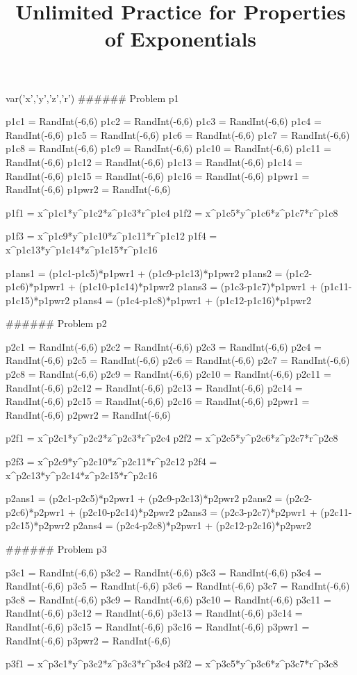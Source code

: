 \documentclass{ximera}
\title{Unlimited Practice for Properties of Exponentials}
\begin{document}


\begin{sagesilent}
var('x','y','z','r')
###### Problem p1

p1c1 = RandInt(-6,6)
p1c2 = RandInt(-6,6)
p1c3 = RandInt(-6,6)
p1c4 = RandInt(-6,6)
p1c5 = RandInt(-6,6)
p1c6 = RandInt(-6,6)
p1c7 = RandInt(-6,6)
p1c8 = RandInt(-6,6)
p1c9 = RandInt(-6,6)
p1c10 = RandInt(-6,6)
p1c11 = RandInt(-6,6)
p1c12 = RandInt(-6,6)
p1c13 = RandInt(-6,6)
p1c14 = RandInt(-6,6)
p1c15 = RandInt(-6,6)
p1c16 = RandInt(-6,6)
p1pwr1 = RandInt(-6,6)
p1pwr2 = RandInt(-6,6)

p1f1 = x^p1c1*y^p1c2*z^p1c3*r^p1c4
p1f2 = x^p1c5*y^p1c6*z^p1c7*r^p1c8

p1f3 = x^p1c9*y^p1c10*z^p1c11*r^p1c12
p1f4 = x^p1c13*y^p1c14*z^p1c15*r^p1c16

p1ans1 = (p1c1-p1c5)*p1pwr1 + (p1c9-p1c13)*p1pwr2
p1ans2 = (p1c2-p1c6)*p1pwr1 + (p1c10-p1c14)*p1pwr2
p1ans3 = (p1c3-p1c7)*p1pwr1 + (p1c11-p1c15)*p1pwr2
p1ans4 = (p1c4-p1c8)*p1pwr1 + (p1c12-p1c16)*p1pwr2


###### Problem p2

p2c1 = RandInt(-6,6)
p2c2 = RandInt(-6,6)
p2c3 = RandInt(-6,6)
p2c4 = RandInt(-6,6)
p2c5 = RandInt(-6,6)
p2c6 = RandInt(-6,6)
p2c7 = RandInt(-6,6)
p2c8 = RandInt(-6,6)
p2c9 = RandInt(-6,6)
p2c10 = RandInt(-6,6)
p2c11 = RandInt(-6,6)
p2c12 = RandInt(-6,6)
p2c13 = RandInt(-6,6)
p2c14 = RandInt(-6,6)
p2c15 = RandInt(-6,6)
p2c16 = RandInt(-6,6)
p2pwr1 = RandInt(-6,6)
p2pwr2 = RandInt(-6,6)

p2f1 = x^p2c1*y^p2c2*z^p2c3*r^p2c4
p2f2 = x^p2c5*y^p2c6*z^p2c7*r^p2c8

p2f3 = x^p2c9*y^p2c10*z^p2c11*r^p2c12
p2f4 = x^p2c13*y^p2c14*z^p2c15*r^p2c16

p2ans1 = (p2c1-p2c5)*p2pwr1 + (p2c9-p2c13)*p2pwr2
p2ans2 = (p2c2-p2c6)*p2pwr1 + (p2c10-p2c14)*p2pwr2
p2ans3 = (p2c3-p2c7)*p2pwr1 + (p2c11-p2c15)*p2pwr2
p2ans4 = (p2c4-p2c8)*p2pwr1 + (p2c12-p2c16)*p2pwr2


###### Problem p3

p3c1 = RandInt(-6,6)
p3c2 = RandInt(-6,6)
p3c3 = RandInt(-6,6)
p3c4 = RandInt(-6,6)
p3c5 = RandInt(-6,6)
p3c6 = RandInt(-6,6)
p3c7 = RandInt(-6,6)
p3c8 = RandInt(-6,6)
p3c9 = RandInt(-6,6)
p3c10 = RandInt(-6,6)
p3c11 = RandInt(-6,6)
p3c12 = RandInt(-6,6)
p3c13 = RandInt(-6,6)
p3c14 = RandInt(-6,6)
p3c15 = RandInt(-6,6)
p3c16 = RandInt(-6,6)
p3pwr1 = RandInt(-6,6)
p3pwr2 = RandInt(-6,6)

p3f1 = x^p3c1*y^p3c2*z^p3c3*r^p3c4
p3f2 = x^p3c5*y^p3c6*z^p3c7*r^p3c8


\end{sagesilent}
\end{document}
